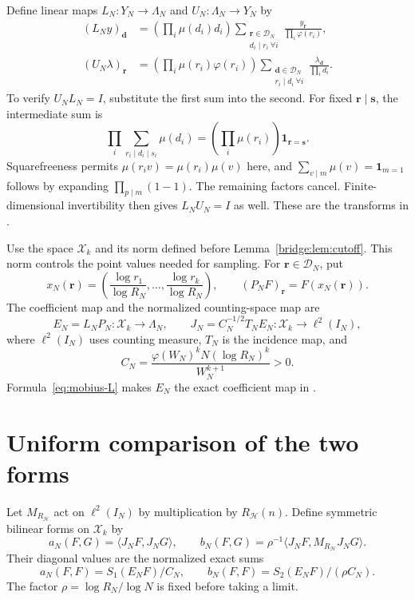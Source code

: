 \documentclass[11pt]{article}
\begin{document}
Define linear maps $L_N:Y_N\to\Lambda_N$ and $U_N:\Lambda_N\to Y_N$ by
\begin{align}
 (L_Ny)_{\boldsymbol d}
 &=\left(\prod_i\mu(d_i)d_i\right)
   \sum_{\substack{\boldsymbol r\in\mathcal D_N\\d_i\mid r_i\ \forall i}}
               \frac{y_{\boldsymbol r}}{\prod_i\varphi(r_i)},\label{eq:mobius-L}\\
 (U_N\lambda)_{\boldsymbol r}
 &=\left(\prod_i\mu(r_i)\varphi(r_i)\right)
   \sum_{\substack{\boldsymbol d\in\mathcal D_N\\r_i\mid d_i\ \forall i}}
               \frac{\lambda_{\boldsymbol d}}{\prod_i d_i}.
               \label{eq:mobius-U}
\end{align}
To verify $U_NL_N=I$, substitute the first sum into the second.
For fixed $\boldsymbol r\mid\boldsymbol s$, the intermediate sum is
\[
 \prod_i\sum_{r_i\mid d_i\mid s_i}\mu(d_i)
   =\left(\prod_i\mu(r_i)\right)\mathbf1_{\boldsymbol r=\boldsymbol s}.
\]
Squarefreeness permits $\mu(r_iv)=\mu(r_i)\mu(v)$ here, and
$\sum_{v\mid m}\mu(v)=\mathbf1_{m=1}$ follows by expanding
$\prod_{p\mid m}(1-1)$.  The remaining factors cancel.
Finite-dimensional invertibility then gives $L_NU_N=I$ as well.
These are the transforms in \cite[(5.7)--(5.8), p.~393]{Maynard}.

Use the space $\mathcal X_k$ and its norm defined before
Lemma~\ref{bridge:lem:cutoff}.  This norm controls the point values
needed for sampling.
For $\boldsymbol r\in\mathcal D_N$, put
\[
 x_N(\boldsymbol r)=
 \left(\frac{\log r_1}{\log R_N},\ldots,
       \frac{\log r_k}{\log R_N}\right),\qquad
 (P_NF)_{\boldsymbol r}=F(x_N(\boldsymbol r)).
\]
The coefficient map and the normalized counting-space map are
\begin{equation}\label{eq:spine-map}
 E_N=L_NP_N:\mathcal X_k\longrightarrow\Lambda_N,
 \qquad J_N=C_N^{-1/2}T_NE_N:\mathcal X_k\longrightarrow\ell^2(I_N),
\end{equation}
where $\ell^2(I_N)$ uses counting measure, $T_N$ is the incidence map,
and
\[
 C_N=\frac{\varphi(W_N)^kN(\log R_N)^k}{W_N^{k+1}}>0.
\]
Formula~\eqref{eq:mobius-L} makes $E_N$ the exact coefficient map in
\cite[Proposition 4.1, pp.~388--389]{Maynard}.

\section{Uniform comparison of the two forms}

Let $M_{R_{\mathcal H}}$ act on $\ell^2(I_N)$ by multiplication by
$R_{\mathcal H}(n)$.  Define symmetric bilinear forms on $\mathcal X_k$ by
\[
 a_N(F,G)=\langle J_NF,J_NG\rangle,\qquad
 b_N(F,G)=\rho^{-1}
          \langle J_NF,M_{R_{\mathcal H}}J_NG\rangle.
\]
Their diagonal values are the normalized exact sums
\[
 a_N(F,F)=S_1(E_NF)/C_N,\qquad
 b_N(F,F)=S_2(E_NF)/(\rho C_N).
\]
The factor $\rho=\log R_N/\log N$ is fixed before taking a limit.
\end{document}
